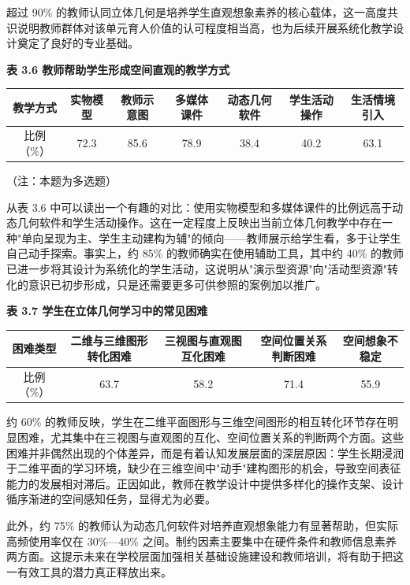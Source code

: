 \documentclass[UTF8,a4paper,12pt,twoside]{ctexart}
\begin{document}
超过 90\% 的教师认同立体几何是培养学生直观想象素养的核心载体，这一高度共识说明教师群体对该单元育人价值的认可程度相当高，也为后续开展系统化教学设计奠定了良好的专业基础。

\textbf{表 3.6 教师帮助学生形成空间直观的教学方式}

\begin{center}
\begin{tabular}{|c|c|c|c|c|c|c|}
\hline
教学方式 & 实物模型 & 教师示意图 & 多媒体课件 & 动态几何软件 & 学生活动操作 & 生活情境引入 \\
\hline
比例（\%） & 72.3 & 85.6 & 78.9 & 38.4 & 40.2 & 63.1 \\
\hline
\end{tabular}
\end{center}

（注：本题为多选题）

从表 3.6 中可以读出一个有趣的对比：使用实物模型和多媒体课件的比例远高于动态几何软件和学生活动操作。这在一定程度上反映出当前立体几何教学中存在一种"单向呈现为主、学生主动建构为辅"的倾向——教师展示给学生看，多于让学生自己动手探索。事实上，约 85\% 的教师确实在使用辅助工具，其中约 40\% 的教师已进一步将其设计为系统化的学生活动，这说明从"演示型资源"向"活动型资源"转化的意识已初步形成，只是还需要更多可供参照的案例加以推广。

\textbf{表 3.7 学生在立体几何学习中的常见困难}

\begin{center}
\begin{tabular}{|c|c|c|c|c|}
\hline
困难类型 & 二维与三维图形转化困难 & 三视图与直观图互化困难 & 空间位置关系判断困难 & 空间想象不稳定 \\
\hline
比例（\%） & 63.7 & 58.2 & 71.4 & 55.9 \\
\hline
\end{tabular}
\end{center}

约 60\% 的教师反映，学生在二维平面图形与三维空间图形的相互转化环节存在明显困难，尤其集中在三视图与直观图的互化、空间位置关系的判断两个方面。这些困难并非偶然出现的个体差异，而是有着认知发展层面的深层原因：学生长期浸润于二维平面的学习环境，缺少在三维空间中"动手"建构图形的机会，导致空间表征能力的发展相对滞后。正因如此，教师在教学设计中提供多样化的操作支架、设计循序渐进的空间感知任务，显得尤为必要。

此外，约 75\% 的教师认为动态几何软件对培养直观想象能力有显著帮助，但实际高频使用率仅在 30\%—40\% 之间。制约因素主要集中在硬件条件和教师信息素养两方面。这提示未来在学校层面加强相关基础设施建设和教师培训，将有助于把这一有效工具的潜力真正释放出来。
\end{document}
